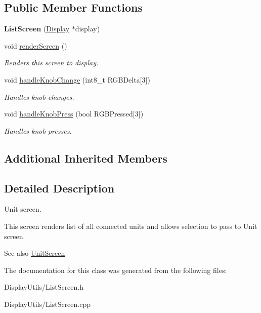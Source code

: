 \subsection*{Public Member Functions}
\begin{DoxyCompactItemize}
\item 
\mbox{\label{classListScreen_a502ff7cf893ae6d10ed7bc1ca7a8ffe8}} 
{\bfseries List\+Screen} (\mbox{\hyperlink{classDisplay}{Display}} $\ast$display)
\item 
\mbox{\label{classListScreen_a364b4ccc88650c13295efae8431b135e}} 
void \mbox{\hyperlink{classListScreen_a364b4ccc88650c13295efae8431b135e}{render\+Screen}} ()
\begin{DoxyCompactList}\small\item\em Renders this screen to display. \end{DoxyCompactList}\item 
\mbox{\label{classListScreen_a4e0f2e67dbfbcf8560209f01d2cab1c6}} 
void \mbox{\hyperlink{classListScreen_a4e0f2e67dbfbcf8560209f01d2cab1c6}{handle\+Knob\+Change}} (int8\+\_\+t R\+G\+B\+Delta\mbox{[}3\mbox{]})
\begin{DoxyCompactList}\small\item\em Handles knob changes. \end{DoxyCompactList}\item 
\mbox{\label{classListScreen_aecf861357be2b6debde43e61c9a7671b}} 
void \mbox{\hyperlink{classListScreen_aecf861357be2b6debde43e61c9a7671b}{handle\+Knob\+Press}} (bool R\+G\+B\+Pressed\mbox{[}3\mbox{]})
\begin{DoxyCompactList}\small\item\em Handles knob presses. \end{DoxyCompactList}\end{DoxyCompactItemize}
\subsection*{Additional Inherited Members}


\subsection{Detailed Description}
Unit screen. 

This screen renders list of all connected units and allows selection to pass to Unit screen. \begin{DoxySeeAlso}{See also}
\mbox{\hyperlink{classUnitScreen}{Unit\+Screen}} 
\end{DoxySeeAlso}


The documentation for this class was generated from the following files\+:\begin{DoxyCompactItemize}
\item 
Display\+Utils/List\+Screen.\+h\item 
Display\+Utils/List\+Screen.\+cpp\end{DoxyCompactItemize}
